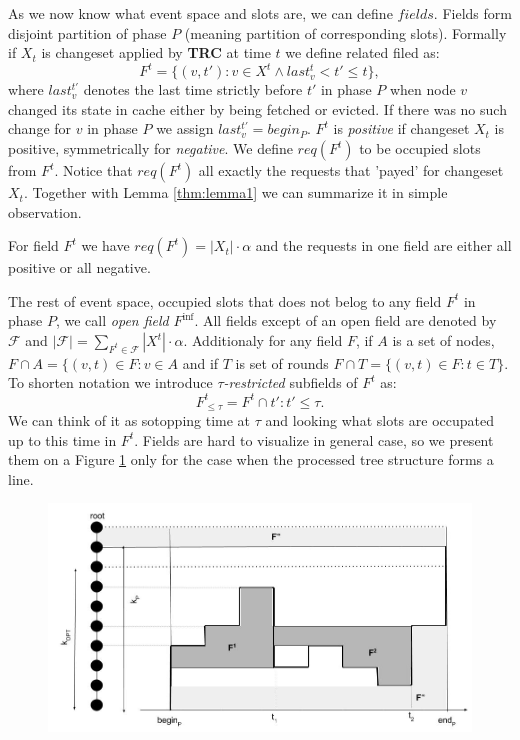 As we now know what event space and slots are, we can define $fields$. Fields 
form disjoint partition of phase $P$ (meaning partition of corresponding 
slots). Formally if $X_t$ is changeset applied by \textbf{TRC} at time $t$ we 
define related filed as:
$$ F^t = \{(v, t'): v \in X^t \wedge last_v^t < t' \leq t\},$$
where $last_v^{t'}$ denotes the last time strictly before $t'$ in phase $P$ 
when node $v$ changed its state in cache either by being fetched or evicted. If 
there was no such change for $v$ in phase $P$ we assign $last_v^{t'} = begin_P$.
$F^t$ is \textit{positive} if changeset $X_t$ is positive, symmetrically for 
\textit{negative}. We define $req(F^t)$ to be occupied slots from $F^t$. Notice 
that $req(F^t)$ all exactly the requests that 'payed' for changeset $X_t$. 
Together with Lemma \ref{thm:lemma1} we can summarize it in simple observation.
\begin{observe}
For field $F^t$ we have $req(F^t) = |X_t| \cdot \alpha$ and the requests 
in one field are either all positive or all negative.
\end{observe}
The rest of event space, occupied slots that does not belog to any field $F^t$ 
in phase $P$, we call \textit{open field} $F^{\inf}$. All fields except of an 
open field are denoted by $\mathcal{F}$ and $|\mathcal{F}| = \sum_{F^t \in 
\mathcal{F}} |X^t| \cdot \alpha$.
Additionaly for any field $F$, if $A$ is a set of nodes, $F \cap A = \{(v,t) 
\in F: v \in A$ and if $T$ is set of rounds $F \cap T = \{(v, t) \in F: t \in 
T\}$. To shorten notation we introduce $\tau$\textit{-restricted} subfields of 
$F^t$ as:
$$F^t_{\leq \tau} = F^t \cap {t': t' \leq \tau}.$$
We can think of it as sotopping time at $\tau$ and looking what slots are 
occupated up to this time in $F^t$.
Fields are hard to visualize in general case, so we present them on a 
Figure \ref{fig:fields} only for the case when the processed tree structure 
forms a line.
\begin{figure}
\label{fig:fields}
\begin{center}
  \includegraphics[width=\textwidth]{fields.jpg}
\end{center}
\end{figure}

